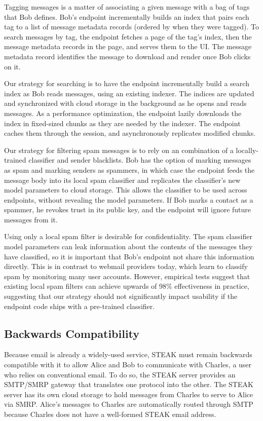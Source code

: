 Tagging messages is a matter of associating a given message with a bag of tags that Bob defines.  Bob’s endpoint incrementally builds an index that pairs each tag to a list of message metadata records (ordered by when they were tagged).  To search messages by tag, the endpoint fetches a page of the tag’s index, then the message metadata records in the page, and serves them to the UI.  The message metadata record identifies the message to download and render once Bob clicks on it.

Our strategy for searching is to have the endpoint incrementally build a search index as Bob reads messages, using an existing indexer.  The indices are updated and synchronized with cloud storage in the background as he opens and reads messages.  As a performance optimization, the endpoint lazily downloads the index in fixed-sized chunks as they are needed by the indexer.  The endpoint caches them through the session, and asynchronously replicates modified chunks.

Our strategy for filtering spam messages is to rely on an combination of a locally-trained classifier and sender blacklists.  Bob has the option of marking messages as spam and marking senders as spammers, in which case the endpoint feeds the message body into its local spam classifier and replicates the classifier’s new model parameters to cloud storage.  This allows the classifier to be used across endpoints, without revealing the model parameters.  If Bob marks a contact as a spammer, he revokes trust in its public key, and the endpoint will ignore future messages from it.

Using only a local spam filter is desirable for confidentiality.  The spam classifier model parameters can leak information about the contents of the messages they have classified, so it is important that Bob’s endpoint not share this information directly.  This is in contrast to webmail providers today, which learn to classify spam by monitoring many user accounts.  However, empirical tests suggest that existing local spam filters can achieve upwards of 98\% effectiveness in practice, suggesting that our strategy should not significantly impact usability if the endpoint code ships with a pre-trained classifier.

\subsection{Backwards Compatibility}
Because email is already a widely-used service, STEAK must remain backwards compatible with it to allow Alice and Bob to communicate with Charles, a user who relies on conventional email.  To do so, the STEAK server provides an SMTP/SMRP gateway that translates one protocol into the other.  The STEAK server has its own cloud storage to hold messages from Charles to serve to Alice via SMRP.  Alice’s messages to Charles are automatically routed through SMTP because Charles does not have a well-formed STEAK email address.

